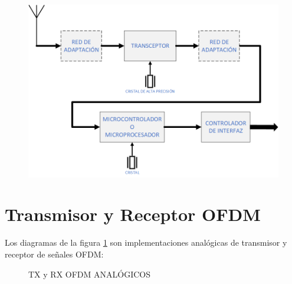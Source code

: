 \documentclass[a4paper,12pt]{report} %
\begin{document}
\begin{figure}[H]
	\centering
	\includegraphics[scale=0.6]{Imagenes/Arquitectura/diagrama2}
\end{figure}

\section{Transmisor y Receptor OFDM \cite{tesis}}

Los diagramas de la figura \ref{txrx} son implementaciones analógicas de transmisor y receptor de señales OFDM:

\begin{figure}[H]
	\centering
	\caption{TX y RX OFDM ANALÓGICOS}
	\label{txrx}
\end{figure}
\end{document}
